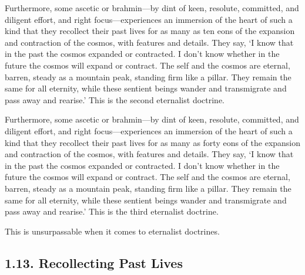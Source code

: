 \documentclass[12pt,openany]{book}%
\begin{document}
Furthermore, some ascetic or brahmin—by dint of keen, resolute, committed, and diligent effort, and right focus—experiences an immersion of the heart of such a kind that they recollect their past lives for as many as ten eons of the expansion and contraction of the cosmos, with features and details. They say, ‘I know that in the past the cosmos expanded or contracted. I don’t know whether in the future the cosmos will expand or contract. The self and the cosmos are eternal, barren, steady as a mountain peak, standing firm like a pillar. They remain the same for all eternity, while these sentient beings wander and transmigrate and pass away and rearise.’ This is the second eternalist doctrine. 

Furthermore, some ascetic or brahmin—by dint of keen, resolute, committed, and diligent effort, and right focus—experiences an immersion of the heart of such a kind that they recollect their past lives for as many as forty eons of the expansion and contraction of the cosmos, with features and details. They say, ‘I know that in the past the cosmos expanded or contracted. I don’t know whether in the future the cosmos will expand or contract. The self and the cosmos are eternal, barren, steady as a mountain peak, standing firm like a pillar. They remain the same for all eternity, while these sentient beings wander and transmigrate and pass away and rearise.’ This is the third eternalist doctrine. 

This is unsurpassable when it comes to eternalist doctrines. 

\subsection*{1.13. Recollecting Past Lives }
\end{document}
